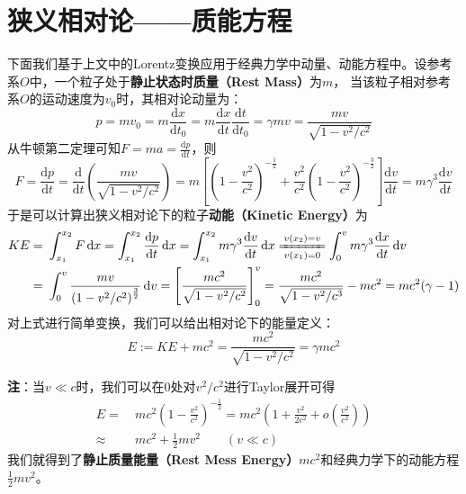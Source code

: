 \documentclass[12pt, a4paper, oneside]{ctexart}
\numberwithin{equation}{section}  %
\def\d{\mathrm{d}}          %
\begin{document}
\section{狭义相对论——质能方程}
下面我们基于上文中的Lorentz变换应用于经典力学中动量、动能方程中。设参考系$O$中，一个粒子处于\textbf{静止状态时质量（Rest Mass）}为$m$，
当该粒子相对参考系$O$的运动速度为$v_0$时，其相对论动量为：
\begin{equation}\label{eq-momentum}
    p = mv_0 = m\frac{\d x}{\d t_0} = m\frac{\d x}{\d t}\frac{\d t}{\d t_0} = \gamma m v = \frac{m v}{\sqrt{1 - v^2/c^2}}
\end{equation}
从牛顿第二定理可知$F = ma = \frac{\d p}{\d t}$，则
\begin{equation}
    F = \frac{\d p}{\d t} = \frac{\d}{\d t}\left(\frac{mv}{\sqrt{1-v^2/c^2}}\right) =
    m\left[\left(1-\frac{v^2}{c^2}\right)^{-\frac{1}{2}}+\frac{v^2}{c^2}\left(1-\frac{v^2}{c^2}\right)^{-\frac{3}{2}}\right]\frac{\d v}{\d t}
    = m\gamma^3\frac{\d v}{\d t}
\end{equation}
于是可以计算出狭义相对论下的粒子\textbf{动能（Kinetic Energy）}为
\begin{equation}
    \begin{aligned}
    KE =&\ \int_{x_1}^{x_2}F\,\d x = \int_{x_1}^{x_2}\frac{\d p}{\d t}\,\d x = \int_{x_1}^{x_2}m\gamma^3\frac{\d v}{\d t}\,\d x
    \xlongequal[v(x_1)=0]{v(x_2)=v} \int_{0}^{v}m\gamma^3\frac{\d x}{\d t}\,\d v\\
    =&\ \int_0^v\frac{mv}{\left(1-v^2/c^2\right)^{\frac{3}{2}}}\,\d v = \left[\frac{mc^2}{\sqrt{1-v^2/c^2}}\right]_0^v = \frac{mc^2}{\sqrt{1-v^2/c^3}}-mc^2 = mc^2(\gamma-1)
    \end{aligned}
\end{equation}
对上式进行简单变换，我们可以给出相对论下的能量定义：
\begin{equation}\label{eq-energy}
    E := KE + mc^2 = \frac{mc^2}{\sqrt{1-v^2/c^2}} = \gamma mc^2
\end{equation}

\textbf{注}：当$v\ll c$时，我们可以在$0$处对$v^2/c^2$进行Taylor展开可得
\begin{equation}
    \begin{aligned}
        E =&\ mc^2\left(1-\frac{v^2}{c^2}\right)^{-\frac{1}{2}} = mc^2\left(1 + \frac{v^2}{2c^2} + o\left(\frac{v^2}{c^2}\right)\right)\\
        \approx&\ mc^2 + \frac{1}{2}mv^2\qquad(v\ll c)
    \end{aligned}
\end{equation}
我们就得到了\textbf{静止质量能量（Rest Mess Energy）}$mc^2$和经典力学下的动能方程$\frac{1}{2}mv^2$。
\end{document}
